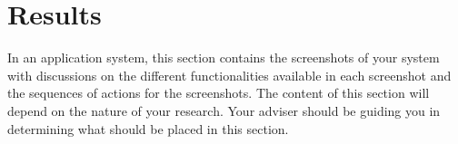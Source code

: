 \section{Results}

In an application system, this section contains the screenshots of your system with discussions on the different functionalities 
available in each screenshot and the sequences of actions for the screenshots. The content of this section will depend on the nature of your
research. Your adviser should be guiding you in determining what should be placed in this section.